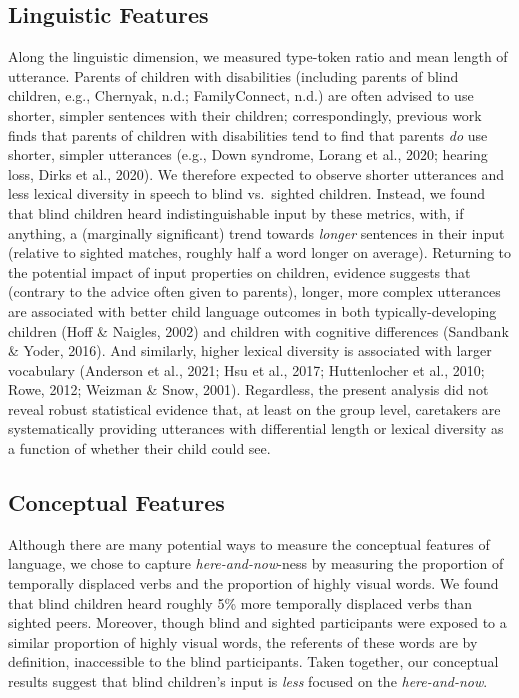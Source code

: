 \documentclass[
  man]{apa6}
\begin{document}
\hypertarget{linguistic-features-2}{%
\subsection{Linguistic Features}\label{linguistic-features-2}}

Along the linguistic dimension, we measured type-token ratio and mean length of utterance. Parents of children with disabilities (including parents of blind children, e.g., Chernyak, n.d.; FamilyConnect, n.d.) are often advised to use shorter, simpler sentences with their children; correspondingly, previous work finds that parents of children with disabilities tend to find that parents \emph{do} use shorter, simpler utterances (e.g., Down syndrome, Lorang et al., 2020; hearing loss, Dirks et al., 2020). We therefore expected to observe shorter utterances and less lexical diversity in speech to blind vs.~sighted children. Instead, we found that blind children heard indistinguishable input by these metrics, with, if anything, a (marginally significant) trend towards \emph{longer} sentences in their input (relative to sighted matches, roughly half a word longer on average). Returning to the potential impact of input properties on children, evidence suggests that (contrary to the advice often given to parents), longer, more complex utterances are associated with better child language outcomes in both typically-developing children (Hoff \& Naigles, 2002) and children with cognitive differences (Sandbank \& Yoder, 2016). And similarly, higher lexical diversity is associated with larger vocabulary (Anderson et al., 2021; Hsu et al., 2017; Huttenlocher et al., 2010; Rowe, 2012; Weizman \& Snow, 2001). Regardless, the present analysis did not reveal robust statistical evidence that, at least on the group level, caretakers are systematically providing utterances with differential length or lexical diversity as a function of whether their child could see.

\hypertarget{conceptual-features-2}{%
\subsection{Conceptual Features}\label{conceptual-features-2}}

Although there are many potential ways to measure the conceptual features of language, we chose to capture \emph{here-and-now}-ness by measuring the proportion of temporally displaced verbs and the proportion of highly visual words. We found that blind children heard roughly 5\% more temporally displaced verbs than sighted peers. Moreover, though blind and sighted participants were exposed to a similar proportion of highly visual words, the referents of these words are by definition, inaccessible to the blind participants. Taken together, our conceptual results suggest that blind children's input is \emph{less} focused on the \emph{here-and-now}.
\end{document}
